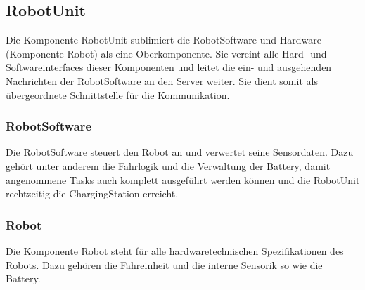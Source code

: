 \subsection{RobotUnit}

Die Komponente RobotUnit sublimiert die RobotSoftware und Hardware (Komponente Robot) als eine Oberkomponente. Sie vereint alle Hard- und Softwareinterfaces dieser Komponenten und leitet die ein- und ausgehenden Nachrichten der RobotSoftware an den Server weiter. Sie dient somit als \"{u}bergeordnete Schnittstelle f\"{u}r die Kommunikation. 

\subsubsection{RobotSoftware}

Die RobotSoftware steuert den Robot an und verwertet seine Sensordaten. Dazu geh\"{o}rt unter anderem die Fahrlogik und die Verwaltung der Battery, damit angenommene Tasks auch komplett ausgef\"{u}hrt werden k\"{o}nnen und die RobotUnit rechtzeitig die ChargingStation erreicht. 

\subsubsection{Robot}

Die Komponente Robot steht f\"{u}r alle hardwaretechnischen Spezifikationen des Robots. Dazu geh\"{o}ren die Fahreinheit und die interne Sensorik so wie die Battery.   